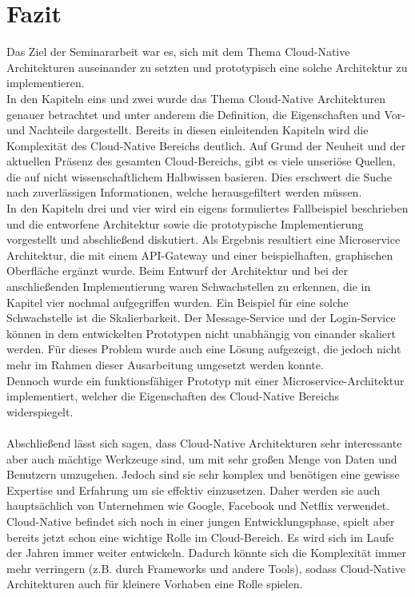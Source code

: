 \chapter{Fazit}
Das Ziel der Seminararbeit war es, sich mit dem Thema Cloud-Native Architekturen auseinander zu setzten und prototypisch eine solche Architektur zu implementieren.\\
In den Kapiteln eins und zwei wurde das Thema Cloud-Native Architekturen genauer betrachtet und unter anderem die Definition, die Eigenschaften und Vor-und Nachteile dargestellt. Bereits in diesen einleitenden Kapiteln wird die Komplexität des Cloud-Native Bereichs deutlich. Auf Grund der Neuheit und der aktuellen Präsenz des gesamten Cloud-Bereichs, gibt es viele unseriöse Quellen, die auf nicht wissenschaftlichem Halbwissen basieren. Dies erschwert die Suche nach zuverlässigen Informationen, welche herausgefiltert werden müssen.\\
In den Kapiteln drei und vier wird ein eigens formuliertes Fallbeispiel beschrieben und die entworfene Architektur sowie die prototypische Implementierung vorgestellt und abschließend diskutiert. Als Ergebnis resultiert eine Microservice Architektur, die mit einem API-Gateway und einer beispielhaften, graphischen Oberfläche ergänzt wurde. Beim Entwurf der Architektur und bei der anschließenden Implementierung waren Schwachstellen zu erkennen, die in Kapitel vier nochmal aufgegriffen wurden. Ein Beispiel für eine solche Schwachstelle ist die Skalierbarkeit. Der Message-Service und der Login-Service können in dem entwickelten Prototypen nicht unabhängig von einander skaliert werden. Für dieses Problem wurde auch eine Lösung aufgezeigt, die jedoch nicht mehr im Rahmen dieser Ausarbeitung umgesetzt werden konnte.\\
Dennoch wurde ein funktionsfähiger Prototyp mit einer Microservice-Architektur implementiert, welcher die Eigenschaften des Cloud-Native Bereichs widerspiegelt.\\
\\
Abschließend lässt sich sagen, dass Cloud-Native Architekturen sehr interessante aber auch mächtige Werkzeuge sind, um mit sehr großen Menge von Daten und Benutzern umzugehen. Jedoch sind sie sehr komplex und benötigen eine gewisse Expertise und Erfahrung um sie effektiv einzusetzen. Daher werden sie auch hauptsächlich von Unternehmen wie Google, Facebook und Netflix verwendet.\\
Cloud-Native befindet sich noch in einer jungen Entwicklungsphase, spielt aber bereits jetzt schon eine wichtige Rolle im Cloud-Bereich. Es wird sich im Laufe der Jahren immer weiter entwickeln. Dadurch könnte sich die Komplexität immer mehr verringern (z.B. durch Frameworks und andere Tools), sodass Cloud-Native Architekturen auch für kleinere Vorhaben eine Rolle spielen.
